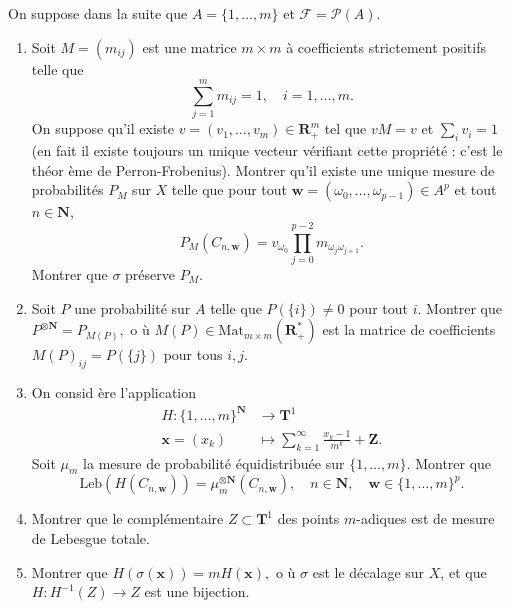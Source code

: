 \documentclass[a4paper,10pt,openany]{article}
\theoremstyle{plain}
\theoremstyle{definition}
\newcommand{\T}{\mathbf{T}}
\newcommand{\R}{\mathbf{R}}
\newcommand{\Z}{\mathbf{Z}}
\newcommand{\N}{\mathbf{N}}
\begin{document}
On suppose dans la suite que $A = \{1, \dots, m\}$ et $\mathcal{F} = \mathcal{P}(A)$.
\begin{enumerate}[resume]
\item Soit $M = (m_{ij})$ est une matrice $m \times m$  \`a coefficients strictement positifs telle que
$$
\sum_{j=1}^m m_{ij} = 1, \quad i = 1, \dots, m.
$$
On suppose qu'il existe $v = (v_1, \dots, v_m) \in \R_+^m$ tel que $vM = v$ et $\sum_{i} v_i = 1$ (en fait il existe toujours un unique vecteur v\'erifiant cette propri\'et\'e : c'est le th\'eor \`eme de Perron-Frobenius). Montrer qu'il existe une unique mesure de probabilit\'es $P_M$ sur $X$ telle que pour tout $\mathbf{w} = (\omega_0, \dots, \omega_{p-1}) \in A^p$ et tout $n \in \N$,
$$
P_M\left(C_{n, \mathbf{w}}\right) = v_{\omega_0} \prod_{j=0}^{p-2} m_{\omega_j \omega_{j+1}}.
$$
Montrer que $\sigma$ pr\'eserve $P_M$.
\item Soit $P$ une probabilit\'e sur $A$ telle que $P(\{i\}) \neq 0$ pour tout $i$. Montrer que $P^{\otimes \N} = P_{M(P)},$ o \`u $M(P) \in \mathrm{Mat}_{m \times m}(\R_+^*)$ est la matrice de coefficients $M(P)_{ij} = P(\{j\})$ pour tous $i,j$.
\item On consid \`ere l'application 
$$
\begin{aligned}
H : \{1,\dots, m\}^\N &\to \T^1\\
\mathbf{x}=(x_k) &\mapsto \sum_{k=1}^\infty \frac{x_k-1}{m^k} + \Z.
\end{aligned}
$$
Soit $\mu_m$ la mesure de probabilit\'e \'equidistribu\'ee sur $\{1, \dots, m\}$. Montrer que
$$\mathrm{Leb}(H(C_{n,\mathbf{w}})) = \mu_m^{\otimes \N}(C_{n, \mathbf{w}}), \quad n \in \N, \quad \mathbf{w} \in \{1, \dots, m\}^p.$$
\item Montrer que le compl\'ementaire $Z \subset \T^1$ des points $m$-adiques est de mesure de Lebesgue totale.
\item Montrer que $H (\sigma(\mathbf{x})) = mH(\mathbf{x}),$ o \`u $\sigma$ est le d\'ecalage sur $X$, et que $H : H^{-1}(Z) \to Z$ est une bijection.
\end{enumerate}
\end{document}
